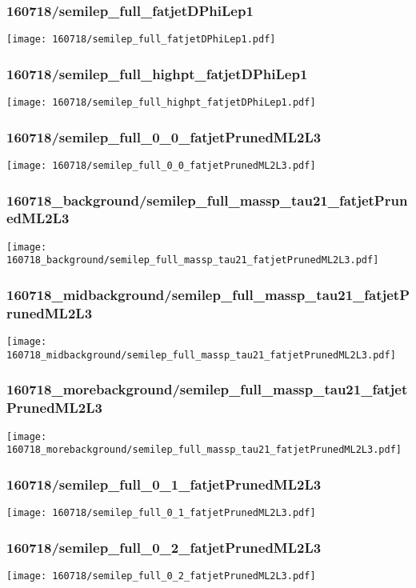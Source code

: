 \begin{frame}
   \frametitle{\small 160718/semilep\_full\_fatjetDPhiLep1}
   \centering
   \texttt{[image: 160718/semilep\_full\_fatjetDPhiLep1.pdf]}
\end{frame}

\begin{frame}
   \frametitle{\small 160718/semilep\_full\_highpt\_fatjetDPhiLep1}
   \centering
   \texttt{[image: 160718/semilep\_full\_highpt\_fatjetDPhiLep1.pdf]}
\end{frame}

\begin{frame}
   \frametitle{\small 160718/semilep\_full\_0\_0\_fatjetPrunedML2L3}
   \centering
   \texttt{[image: 160718/semilep\_full\_0\_0\_fatjetPrunedML2L3.pdf]}
\end{frame}

\begin{frame}
   \frametitle{\small 160718\_background/semilep\_full\_massp\_tau21\_fatjetPrunedML2L3}
   \centering
   \texttt{[image: 160718\_background/semilep\_full\_massp\_tau21\_fatjetPrunedML2L3.pdf]}
\end{frame}

\begin{frame}
   \frametitle{\small 160718\_midbackground/semilep\_full\_massp\_tau21\_fatjetPrunedML2L3}
   \centering
   \texttt{[image: 160718\_midbackground/semilep\_full\_massp\_tau21\_fatjetPrunedML2L3.pdf]}
\end{frame}

\begin{frame}
   \frametitle{\small 160718\_morebackground/semilep\_full\_massp\_tau21\_fatjetPrunedML2L3}
   \centering
   \texttt{[image: 160718\_morebackground/semilep\_full\_massp\_tau21\_fatjetPrunedML2L3.pdf]}
\end{frame}

\begin{frame}
   \frametitle{\small 160718/semilep\_full\_0\_1\_fatjetPrunedML2L3}
   \centering
   \texttt{[image: 160718/semilep\_full\_0\_1\_fatjetPrunedML2L3.pdf]}
\end{frame}

\begin{frame}
   \frametitle{\small 160718/semilep\_full\_0\_2\_fatjetPrunedML2L3}
   \centering
   \texttt{[image: 160718/semilep\_full\_0\_2\_fatjetPrunedML2L3.pdf]}
\end{frame}

